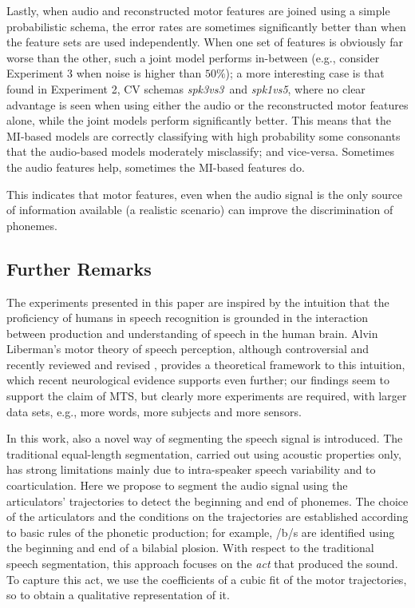 \documentclass[10pt]{article}
\newcommand{\spkb}{\emph{spk3vs3}}
\newcommand{\spkc}{\emph{spk1vs5}}
\begin{document}
Lastly, when audio and reconstructed motor features are joined using a simple probabilistic schema, the error rates
are sometimes significantly better than when the feature sets are used independently.
When one set of features is obviously far worse than the other, such a joint model performs in-between (e.g., consider
Experiment 3 when noise is higher than $50\%$); a more interesting case is that
found in Experiment 2, CV schemas \spkb\ and \spkc, where no clear advantage is seen
when using either the audio or the reconstructed motor features alone, while
the joint models perform significantly better. This means that the MI-based models are
correctly classifying with high probability some consonants that the audio-based models
moderately misclassify; and vice-versa. Sometimes the audio features help, sometimes the
MI-based features do.

This indicates that motor features, even when the audio signal is the only source of
information available (a realistic scenario) can improve the discrimination of phonemes.

\subsection*{Further Remarks}

The experiments presented in this paper are inspired by the intuition that the
proficiency of humans in speech recognition is grounded in the interaction
between production and understanding of speech in the human brain. Alvin
Liberman's motor theory of speech perception, although controversial and
recently reviewed and revised \cite{liberman1,liberman2,galant,massaro},
provides a theoretical framework to this intuition, which recent neurological
evidence \cite{dausilio} supports even further; our findings seem to support the claim 
of MTS, but clearly more experiments are required, with larger data sets, e.g., more words, 
more subjects and more sensors.

In this work, also a novel way of segmenting the speech signal is introduced.
The traditional equal-length segmentation, carried out using acoustic properties
only, has strong limitations mainly due to intra-speaker speech variability and
to coarticulation. Here we propose to segment the audio signal using the articulators'
trajectories to detect the beginning and end of phonemes. The choice of the articulators
and the conditions on the trajectories are established according to basic rules of
the phonetic production; for example, /b/s are identified using the beginning and end of
a bilabial plosion. With respect to the traditional speech segmentation, this approach
focuses on the \emph{act} that produced the sound. To capture this act, we use the
coefficients of a cubic fit of the motor trajectories, so to obtain a qualitative
representation of it.
\end{document}
